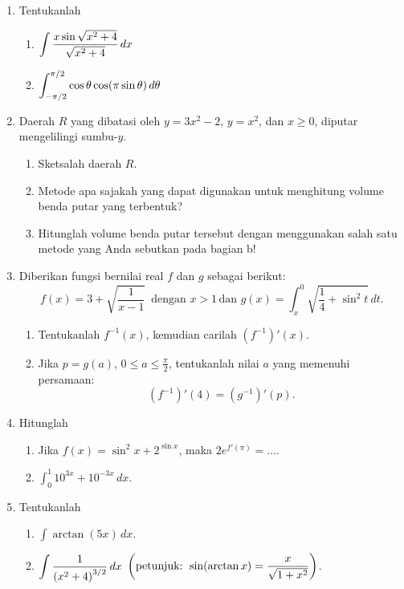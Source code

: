 \begin{enumerate}[leftmargin=*, label={\arabic*}.]
\item Tentukanlah
\begin{enumerate}[label={\alph*}.]
    \item $\ds\int \frac{x\sin\sqrt{x^{2}+4}}{\sqrt{x^{2}+4}}\, dx$
    \item $\ds\int_{-\pi/2}^{\pi/2} \cos\theta\cos\brk*{\pi\sin\theta}\,d\theta$
\end{enumerate}
\item Daerah $R$ yang dibatasi oleh $y=3x^{2}-2$, $y=x^{2}$, dan $x\geq 0$, diputar 
mengelilingi sumbu-$y$.
\begin{enumerate}[label={\alph*}.]
    \item Sketsalah daerah $R$.
    \item Metode apa sajakah yang dapat digunakan untuk menghitung volume benda putar 
    yang terbentuk?
    \item Hitunglah volume benda putar tersebut dengan menggunakan salah satu metode yang 
    Anda sebutkan pada bagian b!
\end{enumerate}
\item Diberikan fungsi bernilai real $f$ dan $g$ sebagai berikut:
\[
f(x)=3+\sqrt{\frac{1}{x-1}}\,\text{ dengan }x > 1\,\text{dan }g(x)=
\int_{x}^{0}\sqrt{\frac{1}{4}+\sin^{2}t}\,dt.
\]
\begin{enumerate}[label={\alph*}.]
    \item Tentukanlah $f^{-1}(x)$, kemudian carilah $(f^{-1})'(x)$.
    \item Jika $p=g(a)$, $0\leq a \leq \frac{\pi}{2}$, tentukanlah nilai $a$ 
    yang memenuhi persamaan:
    \[
    (f^{-1})'(4)=(g^{-1})'(p).
    \]
\end{enumerate}
\item Hitunglah
\begin{enumerate}[label={\alph*}.]
    \item Jika $f(x)=\sin^{2}x+2^{\sin x}$, maka $2e^{f'(\pi)}=\dots$.
    \item $\int_{0}^{1} 10^{3x}+10^{-3x}\,dx$.
\end{enumerate}
\item Tentukanlah
\begin{enumerate}[label={\alph*}.]
    \item $\int \arctan(5x)\,dx$.
    \item $\ds \int \frac{1}{\brk*{x^{2}+4}^{3/2}}\,dx$ 
    $\ds\brk*{\text{petunjuk: } \sin(\arctan x) = \frac{x}{\sqrt{1+x^{2}}}}$.
\end{enumerate}
\end{enumerate}
